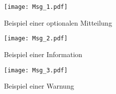\begin{figure}[H]
\centering
\texttt{[image: Msg\_1.pdf]}
\caption{Beispiel einer optionalen Mitteilung}
\label{fig:Message1}
\end{figure}

\begin{figure}[H]
\centering
\texttt{[image: Msg\_2.pdf]}
\caption{Beispiel einer Information}
\label{fig:Message2}
\end{figure}

\begin{figure}[H]
\centering
\texttt{[image: Msg\_3.pdf]}
\caption{Beispiel einer Warnung}
\label{fig:Message3}
\end{figure}
